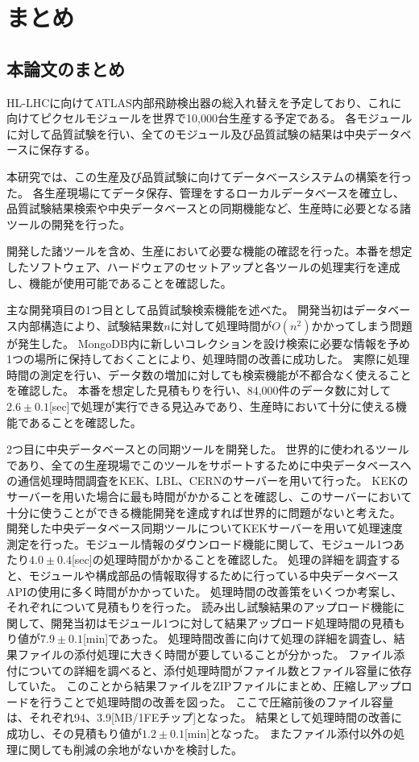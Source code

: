 \chapter{まとめ}

\section{本論文のまとめ}
HL-LHCに向けてATLAS内部飛跡検出器の総入れ替えを予定しており、これに向けてピクセルモジュールを世界で10,000台生産する予定である。
各モジュールに対して品質試験を行い、全てのモジュール及び品質試験の結果は中央データベースに保存する。

本研究では、この生産及び品質試験に向けてデータベースシステムの構築を行った。
各生産現場にてデータ保存、管理をするローカルデータベースを確立し、品質試験結果検索や中央データベースとの同期機能など、生産時に必要となる諸ツールの開発を行った。

開発した諸ツールを含め、生産において必要な機能の確認を行った。本番を想定したソフトウェア、ハードウェアのセットアップと各ツールの処理実行を達成し、機能が使用可能であることを確認した。

主な開発項目の1つ目として品質試験検索機能を述べた。
開発当初はデータベース内部構造により、試験結果数$n$に対して処理時間が$O(n^2)$かかってしまう問題が発生した。
MongoDB内に新しいコレクションを設け検索に必要な情報を予め1つの場所に保持しておくことにより、処理時間の改善に成功した。
実際に処理時間の測定を行い、データ数の増加に対しても検索機能が不都合なく使えることを確認した。
本番を想定した見積もりを行い、84,000件のデータ数に対して$2.6\pm0.1$[sec]で処理が実行できる見込みであり、生産時において十分に使える機能であることを確認した。

2つ目に中央データベースとの同期ツールを開発した。
世界的に使われるツールであり、全ての生産現場でこのツールをサポートするために中央データベースへの通信処理時間調査をKEK、LBL、CERNのサーバーを用いて行った。
KEKのサーバーを用いた場合に最も時間がかかることを確認し、このサーバーにおいて十分に使うことができる機能開発を達成すれば世界的に問題がないと考えた。
開発した中央データベース同期ツールについてKEKサーバーを用いて処理速度測定を行った。モジュール情報のダウンロード機能に関して、モジュール1つあたり$4.0\pm 0.4$[sec]の処理時間がかかることを確認した。
処理の詳細を調査すると、モジュールや構成部品の情報取得するために行っている中央データベースAPIの使用に多く時間がかかっていた。
処理時間の改善策をいくつか考案し、それぞれについて見積もりを行った。
読み出し試験結果のアップロード機能に関して、開発当初はモジュール1つに対して結果アップロード処理時間の見積もり値が$7.9 ± 0.1$[min]であった。
処理時間改善に向けて処理の詳細を調査し、結果ファイルの添付処理に大きく時間が要していることが分かった。
ファイル添付についての詳細を調べると、添付処理時間がファイル数とファイル容量に依存していた。
このことから結果ファイルをZIPファイルにまとめ、圧縮しアップロードを行うことで処理時間の改善を図った。
ここで圧縮前後のファイル容量は、それぞれ94、3.9[MB/1FEチップ]となった。
結果として処理時間の改善に成功し、その見積もり値が$1.2\pm 0.1$[min]となった。
またファイル添付以外の処理に関しても削減の余地がないかを検討した。

